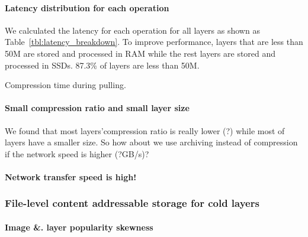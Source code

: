 \paragraph{Latency distribution for each operation}

We calculated the latency for each operation for all layers as shown as Table~\ref{tbl:latency_breakdown}.
To improve performance, layers that are less than 50M are stored and processed in RAM while the rest layers are stored and processed in SSDs. 87.3\% of layers are less than 50M.   
  

Compression time during pulling. 

\paragraph{Small compression ratio and small layer size}





We found that most layers'compression ratio is really lower (?) while most of layers have a smaller size. 
So how about we use archiving instead of compression if the network speed is higher (?GB/s)?

\paragraph{Network transfer speed is high!}

\subsubsection{File-level content addressable storage for cold layers}

\paragraph{Image \&. layer popularity skewness} 

